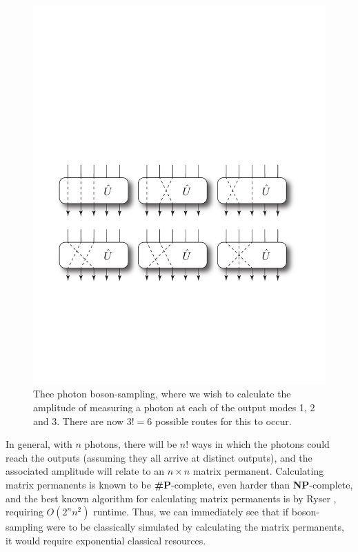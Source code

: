 \documentclass[aps,pra,twocolumn,amsmath,amssymb,nofootinbib,superscriptaddress]{revtex4}
\begin{document}
\begin{figure}[!htb]
\includegraphics[width=\columnwidth]{three_photon_combinatorics}
\caption{Thee photon boson-sampling, where we wish to calculate the amplitude of measuring a photon at each of the output modes 1, 2 and 3. There are now \mbox{$3!=6$} possible routes for this to occur.} \label{fig:three_photon_perm}
\end{figure}

In general, with $n$ photons, there will be $n!$ ways in which the photons could reach the outputs (assuming they all arrive at distinct outputs), and the associated amplitude will relate to an \mbox{$n\times n$} matrix permanent. Calculating matrix permanents is known to be \textbf{\#P}-complete, even harder than \textbf{NP}-complete, and the best known algorithm for calculating matrix permanents is by Ryser \cite{bib:Ryser63}, requiring \mbox{$O(2^n n^2)$} runtime. Thus, we can immediately see that if boson-sampling were to be classically simulated by calculating the matrix permanents, it would require exponential classical resources.
\end{document}
